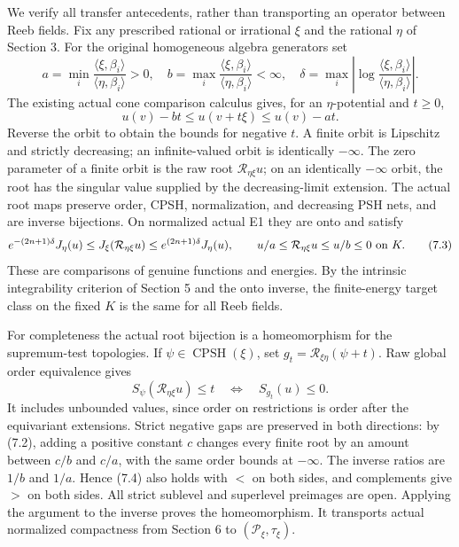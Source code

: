 \documentclass[
  10pt,
]{article}
\begin{document}
We verify all transfer antecedents, rather than transporting an operator
between Reeb fields. Fix any prescribed rational or irrational \(\xi\)
and the rational \(\eta\) of Section 3. For the original homogeneous
algebra generators set \[
 a=\min_i\frac{\langle\xi,\beta_i\rangle}
                    {\langle\eta,\beta_i\rangle}>0,\quad
 b=\max_i\frac{\langle\xi,\beta_i\rangle}
                    {\langle\eta,\beta_i\rangle}<\infty,\quad
 \delta=\max_i\left|\log\frac{\langle\xi,\beta_i\rangle}
                            {\langle\eta,\beta_i\rangle}\right|.
                                                               \tag{7.1}
\] The existing actual cone comparison calculus gives, for an
\(\eta\)-potential and \(t\geq0\), \[
 u(v)-bt\leq u(v+t\xi)\leq u(v)-at.                            \tag{7.2}
\] Reverse the orbit to obtain the bounds for negative \(t\). A finite
orbit is Lipschitz and strictly decreasing; an infinite-valued orbit is
identically \(-\infty\). The zero parameter of a finite orbit is the
raw root \(\mathcal R_{\eta\xi}u\); on an identically \(-\infty\)
orbit, the root has the singular value supplied by the decreasing-limit
extension. The actual root maps preserve order, CPSH,
normalization, and decreasing PSH nets, and are inverse bijections. On
normalized actual E1 they are onto and satisfy \[
 e^{-(2n+1)\delta}J_\eta(u)
 \leq J_\xi(\mathcal R_{\eta\xi}u)
 \leq e^{(2n+1)\delta}J_\eta(u),\qquad
       u/a\leq\mathcal R_{\eta\xi}u\leq u/b\leq0\ \hbox{on }K.
                                                               \tag{7.3}
\] These are comparisons of genuine functions and energies. By the
intrinsic integrability criterion of Section 5 and the onto inverse, the
finite-energy target class on the fixed \(K\) is the same for all Reeb
fields.

For completeness the actual root bijection is a homeomorphism for the
supremum-test topologies. If \(\psi\in\operatorname{CPSH}(\xi)\), set
\(g_t=\mathcal R_{\xi\eta}(\psi+t)\). Raw global order equivalence gives
\[
 S_\psi(\mathcal R_{\eta\xi}u)\leq t
              \quad\Longleftrightarrow\quad S_{g_t}(u)\leq0.    \tag{7.4}
\] It includes unbounded values, since order on restrictions is order
after the equivariant extensions. Strict negative gaps are preserved in
both directions: by (7.2), adding a positive constant \(c\) changes
every finite root by an amount between \(c/b\) and \(c/a\), with the
same order bounds at \(-\infty\). The inverse ratios are \(1/b\) and
\(1/a\). Hence (7.4) also holds with \(<\) on both sides, and
complements give \(>\) on both sides. All strict sublevel and superlevel
preimages are open. Applying the argument to the inverse proves the
homeomorphism. It transports actual normalized compactness from Section
6 to \((\mathcal P_\xi,\tau_\xi)\).
\end{document}
